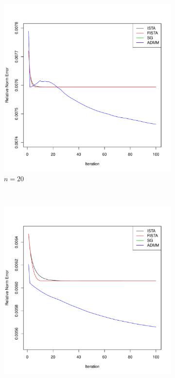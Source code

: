 \documentclass[12pt, leqno]{article}
\theoremstyle{remark}
\begin{document}
\begin{figure}[H]
  \centering
    \begin{subfigure}[b]{0.4\textwidth}
        \includegraphics[width=\textwidth]{20cvgc2-cn.pdf}
        \caption{$n=20$}
        \label{fig:20}
    \end{subfigure}
~
    \begin{subfigure}[b]{0.4\textwidth}
        \includegraphics[width=\textwidth]{50cvgc2-cn.pdf}

\end{subfigure}
\end{figure}
\end{document}
